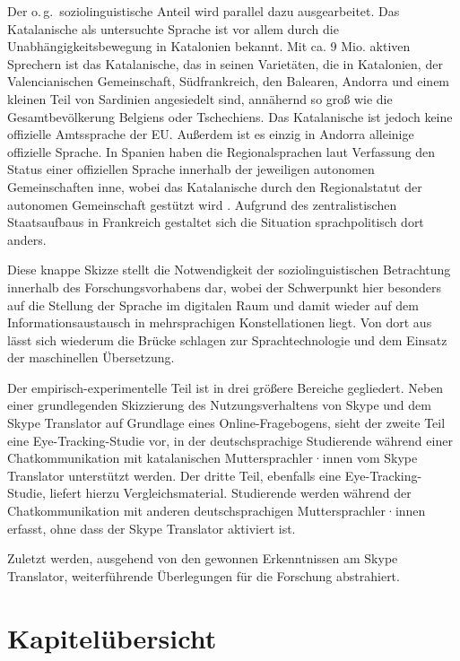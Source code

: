 Der o.\,g.\ soziolinguistische Anteil wird parallel dazu ausgearbeitet. Das Katalanische als untersuchte Sprache ist vor allem durch die Unabhängigkeitsbewegung in Katalonien bekannt. Mit ca. 9 Mio. aktiven Sprechern ist das Katalanische, das in seinen Varietäten, die in Katalonien, der Valencianischen Gemeinschaft, Südfrankreich, den Balearen, Andorra und einem kleinen Teil von Sardinien angesiedelt sind, annähernd so groß wie die Gesamtbevölkerung Belgiens oder Tschechiens. Das Katalanische ist jedoch keine offizielle Amtssprache der EU. Außerdem ist es einzig in Andorra alleinige offizielle Sprache. In Spanien haben die Regionalsprachen laut Verfassung den Status einer offiziellen Sprache innerhalb der jeweiligen autonomen Gemeinschaften inne, wobei das Katalanische durch den Regionalstatut der autonomen Gemeinschaft gestützt wird \citep[414]{bochmann_sprachpolitik_2011}. Aufgrund des zentralistischen Staatsaufbaus in Frankreich gestaltet sich die Situation sprachpolitisch dort anders.

Diese knappe Skizze stellt die Notwendigkeit der soziolinguistischen Betrachtung innerhalb des Forschungsvorhabens dar, wobei der Schwerpunkt hier besonders auf die Stellung der Sprache im digitalen Raum und damit wieder auf dem Informationsaustausch in mehrsprachigen Konstellationen liegt. Von dort aus lässt sich wiederum die Brücke schlagen zur Sprachtechnologie und dem Einsatz der maschinellen Übersetzung.

Der empirisch-experimentelle Teil ist in drei größere Bereiche gegliedert. Neben einer grundlegenden Skizzierung des Nutzungsverhaltens von Skype und dem Skype Translator auf Grundlage eines Online-Fragebogens, sieht der zweite Teil eine Eye-Tracking-Studie vor, in der deutschsprachige Studierende während einer Chatkommunikation mit katalanischen Muttersprachler·innen vom Skype Translator unterstützt werden. Der dritte Teil, ebenfalls eine Eye-Tracking-Studie, liefert hierzu Vergleichsmaterial. Studierende werden während der Chatkommunikation mit anderen deutschsprachigen Muttersprachler·innen erfasst, ohne dass der Skype Translator aktiviert ist.

Zuletzt werden, ausgehend von den gewonnen Erkenntnissen am Skype Translator, weiterführende Überlegungen für die Forschung abstrahiert.



\section{Kapitelübersicht}
\label{K1:sec:gliederung}\largerpage

